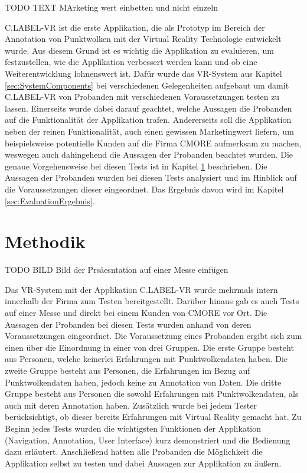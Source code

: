 TODO TEXT MArketing wert einbetten und nicht einzeln

C.LABEL-VR ist die erste Applikation, die als Prototyp im Bereich der Annotation von Punktwolken mit der Virtual Reality Technologie entwickelt wurde. Aus diesem Grund ist es wichtig die Applikation zu evaluieren, um festzustellen, wie die Applikation verbessert werden kann und ob eine Weiterentwicklung lohnenswert ist. Dafür wurde das VR-System aus Kapitel \ref{sec:SystemComponents} bei verschiedenen Gelegenheiten aufgebaut um damit C.LABEL-VR von Probanden mit verschiedenen Voraussetzungen testen zu lassen. Einerseits wurde dabei darauf geachtet, welche Aussagen die Probanden auf die Funktionalität der Applikation trafen. Andererseits soll die Applikation neben der reinen Funktionalität, auch einen gewissen Marketingwert liefern, um beispielsweise potentielle Kunden auf die Firma CMORE aufmerksam zu machen, weswegen auch dahingehend die Aussagen der Probanden beachtet wurden. Die genaue Vorgehensweise bei diesen Tests ist in Kapitel \ref{sec:Methodik} beschrieben. Die Aussagen der Probanden wurden bei diesen Tests analysiert und im Hinblick auf die Voraussetzungen dieser eingeordnet. Das Ergebnis davon wird im Kapitel \ref{sec:EvaluationErgebnis}.

\section{Methodik}
\label{sec:Methodik}
TODO BILD Bild der Prsäesntation auf einer Messe einfügen

Das VR-System mit der Applikation C.LABEL-VR wurde mehrmals intern innerhalb der Firma zum Testen bereitgestellt. Darüber hinaus gab es auch Tests auf einer Messe und direkt bei einem Kunden von CMORE vor Ort. Die Aussagen der Probanden bei diesen Tests wurden anhand von deren Voraussetzungen eingeordnet. Die Voraussetzung eines Probanden ergibt sich zum einen über die Einordnung in einer von drei Gruppen. Die erste Gruppe besteht aus Personen, welche keinerlei Erfahrungen mit Punktwolkendaten haben. Die zweite Gruppe besteht aus Personen, die Erfahrungen im Bezug auf Punktwolkendaten haben, jedoch keine zu Annotation von Daten. Die dritte Gruppe besteht aus Personen die sowohl Erfahrungen mit Punktwolkendaten, als auch mit deren Annotation haben. Zusätzlich wurde bei jedem Tester berücksichtigt, ob dieser bereits Erfahrungen mit Virtual Reality gemacht hat. Zu Beginn jedes Tests wurden die wichtigsten Funktionen der Applikation (Navigation, Annotation, User Interface) kurz demonstriert und die Bedienung dazu erläutert. Anschließend hatten alle Probanden die Möglichkeit die Applikation selbst zu testen und dabei Aussagen zur Applikation zu äußern.\\

